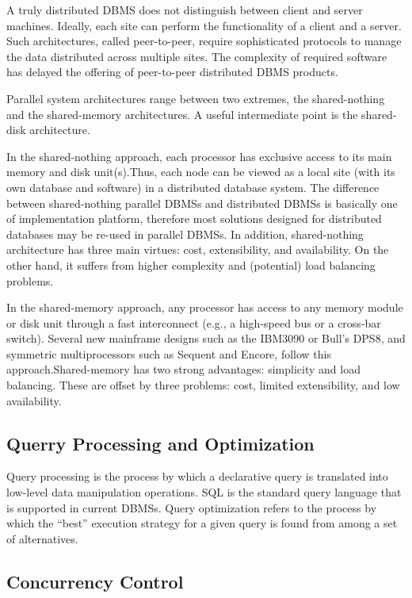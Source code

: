 \documentclass{article}
\begin{document}
A truly distributed DBMS does not distinguish between client and server machines. Ideally, each site can perform the functionality of a client and a server. Such architectures, called peer-to-peer, require sophisticated protocols to manage the data distributed across multiple sites. The complexity of required software has delayed the offering of peer-to-peer distributed DBMS products.

Parallel system architectures range between two extremes, the shared-nothing and the shared-memory architectures. A useful intermediate point is the shared-disk architecture.

In the shared-nothing approach, each processor has exclusive access to its main memory and disk unit(s).Thus, each node can be viewed as a local site (with its own database and software) in a distributed database system. The difference between shared-nothing parallel DBMSs and distributed DBMSs is basically one of implementation platform, therefore most solutions designed for distributed databases may be re-used in parallel DBMSs. In addition, shared-nothing architecture has three main virtues: cost, extensibility, and availability. On the other hand, it suffers from higher complexity and (potential) load balancing problems.

In the shared-memory approach, any processor has access to any memory module or disk unit through a fast interconnect (e.g., a high-speed bus or a cross-bar switch). Several new mainframe designs such as the IBM3090 or Bull’s DPS8, and symmetric multiprocessors such as Sequent and Encore, follow this approach.Shared-memory has two strong advantages: simplicity and load balancing. These are offset by three problems: cost, limited extensibility, and low availability.

\subsection{Querry Processing and Optimization}
Query processing is the process by which a declarative query is translated into low-level data manipulation operations. SQL is the standard query language that is supported in current DBMSs. Query optimization refers to the process by which the “best” execution strategy for a given query is found from among a set of alternatives.

\subsection{Concurrency Control}
\end{document}
